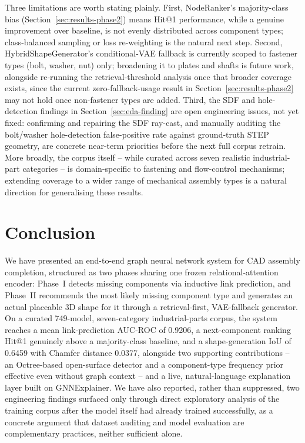\documentclass[sn-mathphys,Numbered]{sn-jnl}
\begin{document}
Three limitations are worth stating plainly. First, NodeRanker's majority-class bias (Section~\ref{sec:results-phase2}) means Hit@1 performance, while a genuine improvement over baseline, is not evenly distributed across component types; class-balanced sampling or loss re-weighting is the natural next step. Second, HybridShapeGenerator's conditional-VAE fallback is currently scoped to fastener types (bolt, washer, nut) only; broadening it to plates and shafts is future work, alongside re-running the retrieval-threshold analysis once that broader coverage exists, since the current zero-fallback-usage result in Section~\ref{sec:results-phase2} may not hold once non-fastener types are added. Third, the SDF and hole-detection findings in Section~\ref{sec:eda-finding} are open engineering issues, not yet fixed: confirming and repairing the SDF ray-cast, and manually auditing the bolt/washer hole-detection false-positive rate against ground-truth STEP geometry, are concrete near-term priorities before the next full corpus retrain. More broadly, the corpus itself -- while curated across seven realistic industrial-part categories -- is domain-specific to fastening and flow-control mechanisms; extending coverage to a wider range of mechanical assembly types is a natural direction for generalising these results.

\section{Conclusion}\label{sec:conclusion}

We have presented an end-to-end graph neural network system for CAD assembly completion, structured as two phases sharing one frozen relational-attention encoder: Phase~I detects missing components via inductive link prediction, and Phase~II recommends the most likely missing component type and generates an actual placeable 3D shape for it through a retrieval-first, VAE-fallback generator. On a curated 749-model, seven-category industrial-parts corpus, the system reaches a mean link-prediction AUC-ROC of 0.9206, a next-component ranking Hit@1 genuinely above a majority-class baseline, and a shape-generation IoU of 0.6459 with Chamfer distance 0.0377, alongside two supporting contributions -- an Octree-based open-surface detector and a component-type frequency prior effective even without graph context -- and a live, natural-language explanation layer built on GNNExplainer. We have also reported, rather than suppressed, two engineering findings surfaced only through direct exploratory analysis of the training corpus after the model itself had already trained successfully, as a concrete argument that dataset auditing and model evaluation are complementary practices, neither sufficient alone.
\end{document}
